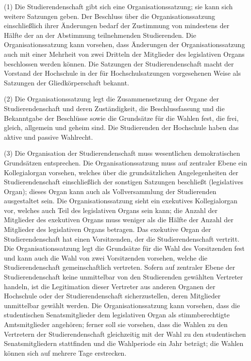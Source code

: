 \documentclass[
10pt,
a4paper,
twoside,								%
titlepage=false,							%
draft=false								%
]{scrartcl}
\begin{document}
(1) Die Studierendenschaft gibt sich eine Organisationssatzung; sie kann sich weitere Satzungen geben. Der Beschluss über die Organisationssatzung einschließlich ihrer Änderungen bedarf der Zustimmung von mindestens der Hälfte der an der Abstimmung teilnehmenden Studierenden. Die Organisationssatzung kann vorsehen, dass Änderungen der Organisationssatzung auch mit einer Mehrheit von zwei Dritteln der Mitglieder des legislativen Organs beschlossen werden können. Die Satzungen der Studierendenschaft macht der Vorstand der Hochschule in der für Hochschulsatzungen vorgesehenen Weise als Satzungen der Gliedkörperschaft bekannt.

(2) Die Organisationssatzung legt die Zusammensetzung der Organe der Studierendenschaft und deren Zuständigkeit, die Beschlussfassung und die Bekanntgabe der Beschlüsse sowie die Grundsätze für die Wahlen fest, die frei, gleich, allgemein und geheim sind. Die Studierenden der Hochschule haben das aktive und passive Wahlrecht.

(3) Die Organisation der Studierendenschaft muss wesentlichen demokratischen Grundsätzen entsprechen. Die Organisationssatzung muss auf zentraler Ebene ein Kollegialorgan vorsehen, welches über die grundsätzlichen Angelegenheiten der Studierendenschaft einschließlich der sonstigen Satzungen beschließt (legislatives Organ); dieses Organ kann auch als Vollversammlung der Studierenden ausgestaltet sein. Die Organisationssatzung sieht ein exekutives Kollegialorgan vor, welches auch Teil des legislativen Organs sein kann; die Anzahl der Mitglieder des exekutiven Organs muss weniger als die Hälfte der Anzahl der Mitglieder des legislativen Organs betragen. Das exekutive Organ der Studierendenschaft hat einen Vorsitzenden, der die Studierendenschaft vertritt. Die Organisationssatzung legt die Grundsätze für die Wahl des Vorsitzenden fest und kann auch die Wahl von zwei Vorsitzenden vorsehen, welche die Studierendenschaft gemeinschaftlich vertreten. Sofern auf zentraler Ebene der Studierendenschaft keine unmittelbar von den Studierenden gewählten Vertreter handeln, ist die Legitimation dieser Vertreter aus anderen Organen der Hochschule oder der Studierendenschaft sicherzustellen, deren Mitglieder unmittelbar gewählt werden. Die Organisationssatzung kann vorsehen, dass die studentischen Senatsmitglieder dem legislativen Organ als stimmberechtigte Amtsmitglieder angehören; ferner soll sie vorsehen, dass die Wahlen zu den Vertretern der Studierendenschaft gleichzeitig mit der Wahl zu den studentischen Senatsmitgliedern stattfinden und die Wahlperiode ein Jahr beträgt; die Wahlen können sich auf mehrere Tage erstrecken.
\end{document}
